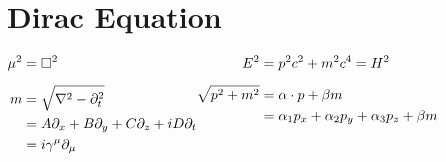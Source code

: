 \documentclass[12pt]{article}
\begin{document}
\section{Dirac Equation}

\noindent
\(
    \hfill
    \begin{aligned}[t]
        \mu^2 & = \square^2
            \\[5pt]
        m & = \sqrt{\nabla^2 - \partial_t^2} \\
        & = A \partial_x + B \partial_y + C \partial_z + i D \partial_t \\
        & = i \gamma^\mu \partial_\mu
    \end{aligned}
    \hfill
    \begin{aligned}[t]
        E^2 & = p^2 c^2 + m^2 c^4 = H^2
            \\[5pt]
        \sqrt{p^2 + m^2} & = \alpha \cdot p + \beta m\\
        & = \alpha_1 p_x + \alpha_2 p_y + \alpha_3 p_z + \beta m
    \end{aligned}
    \hfill
\)
\end{document}
